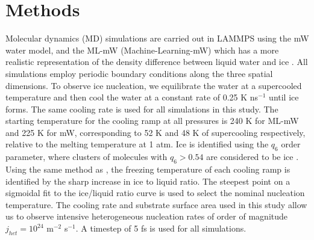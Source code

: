 \documentclass[journal abbreviation, manuscript]{copernicus}
\begin{document}





\section{Methods}

Molecular dynamics (MD) simulations are carried out in LAMMPS \citep{plimpton1995} using the mW \citep{molinero2009} water model, and the ML-mW (Machine-Learning-mW) which has a more realistic representation of the density difference between liquid water and ice  \citep{chan2019}. All simulations employ periodic boundary conditions along the three spatial dimensions. To observe ice nucleation, we equilibrate the water at a supercooled temperature and then cool the water at a constant rate of 0.25 K ns$^{-1}$ until ice forms. The same cooling rate is used for all simulations in this study. The starting temperature for the cooling ramp at all pressures is 240 K for ML-mW and 225 K for mW, corresponding to 52 K and 48 K of supercooling respectively, relative to the melting temperature at 1 atm. Ice is identified using the $q_6$ order parameter, where clusters of molecules with $q_6 > 0.54$ are considered to be ice \citep{steinhardt1983,lupi2014,rosky2022}. Using the same method as \citet{rosky2022}, the freezing temperature of each cooling ramp is identified by the sharp increase in ice to liquid ratio. The steepest point on a sigmoidal fit to the ice/liquid ratio curve is used to select the nominal nucleation temperature. The cooling rate and substrate surface area used in this study allow us to observe intensive heterogeneous nucleation rates of order of magnitude $j_{het} = 10^{24}$ m$^{-2}$ s$^{-1}$. A timestep of 5 fs is used for all simulations.
\end{document}
